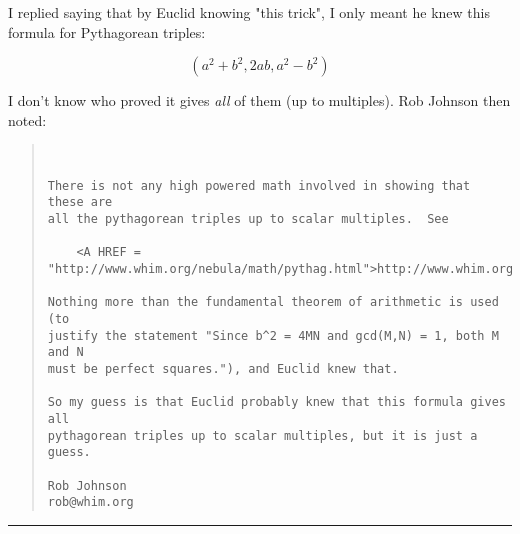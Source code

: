 I replied saying that by Euclid knowing "this trick", I only 
meant he knew this formula for Pythagorean triples:

$$

(a^{2} + b^{2}, 2ab, a^{2} - b^{2})
$$
    
I don't know who proved it gives \emph{all} of them (up to multiples).  
Rob Johnson then noted:
\begin{quote}

\begin{verbatim}


There is not any high powered math involved in showing that these are
all the pythagorean triples up to scalar multiples.  See

    <A HREF = "http://www.whim.org/nebula/math/pythag.html">http://www.whim.org/nebula/math/pythag.html</A>

Nothing more than the fundamental theorem of arithmetic is used (to
justify the statement "Since b^2 = 4MN and gcd(M,N) = 1, both M and N
must be perfect squares."), and Euclid knew that.

So my guess is that Euclid probably knew that this formula gives all
pythagorean triples up to scalar multiples, but it is just a guess.

Rob Johnson
rob@whim.org
\end{verbatim}
    
\end{quote}

\par\noindent\rule{\textwidth}{0.4pt}
